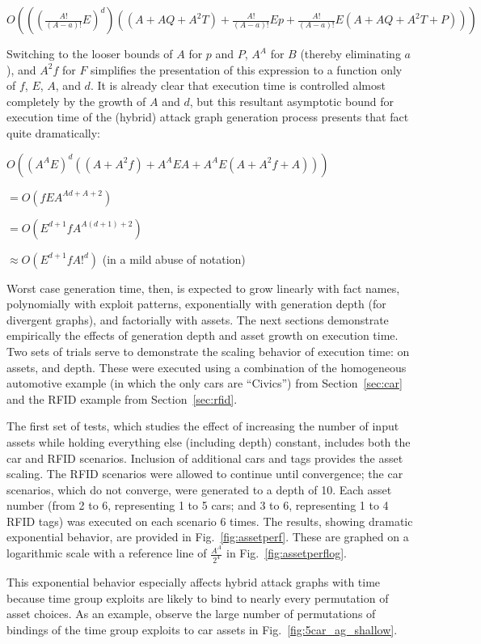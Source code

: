 $O(((\frac{A!}{(A-a)!}E)^d)((A+AQ + A^2T) + \frac{A!}{(A-a)!}Ep + \frac{A!}{(A-a)!}E(A+AQ + A^2T+P)))$

Switching to the looser bounds of $A$ for $p$ and $P$, $A^A$ for $B$ 
(thereby eliminating $a$), and $A^2f$ for $F$
simplifies the presentation of this expression to a function only of $f$,
$E$, $A$, and $d$. It is already clear that execution time is controlled almost
completely by the growth of $A$ and $d$, but this resultant asymptotic bound for
execution time of the (hybrid) attack graph generation process presents that 
fact quite dramatically:

$O((A^AE)^d((A+A^2f) + A^AEA + A^AE(A+A^2f+A)))$

$= O(fEA^{Ad+A+2})$

$= O(E^{d+1}fA^{A(d+1)+2})$

$\approx O(E^{d+1}fA!^{d})$ (in a mild abuse of notation)

Worst case generation time, then, is expected to grow linearly with fact names, 
polynomially with exploit patterns, exponentially with generation depth (for divergent 
graphs), and factorially with assets. The next sections demonstrate empirically
the effects of generation depth and asset growth on execution time.
Two sets of trials serve to demonstrate the scaling behavior of execution time:
on assets, and depth. These were executed using a combination of the 
homogeneous automotive example (in which the only cars are ``Civics'') from
Section~\ref{sec:car} and the RFID example from Section~\ref{sec:rfid}.

The first set of tests, which studies the effect of increasing the number of 
input assets while holding everything else (including depth) constant,
includes both the car and RFID scenarios. Inclusion of additional cars and
tags provides the asset scaling. The RFID scenarios were allowed to continue
until convergence; the car scenarios, which do not converge, were generated
to a depth of 10. Each asset number (from 2 to 6, representing 1 to 5 cars; and
3 to 6, representing 1 to 4 RFID tags) was executed on each scenario 6 times.
The results, showing dramatic exponential behavior, are provided in 
Fig.~\ref{fig:assetperf}. These are graphed on a logarithmic scale with a
reference line of $\frac{A^A}{2^4}$ in Fig.~\ref{fig:assetperflog}.

This exponential behavior especially affects hybrid attack graphs with time 
because time group exploits are likely to bind to nearly every permutation of 
asset choices. As an example, observe the large number of permutations of 
bindings of the time group exploits to car assets in 
Fig.~\ref{fig:5car_ag_shallow}.

